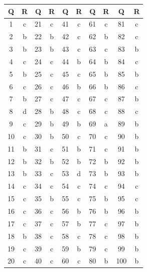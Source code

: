 \begin{center}
\begin{tabular}{|c|c||c|c||c|c||c|c||c|c|}
\hline
\textbf{Q} & \textbf{R} & \textbf{Q} & \textbf{R} & \textbf{Q} & \textbf{R} & \textbf{Q} & \textbf{R} & \textbf{Q} & \textbf{R} \\
\hline
1 & c & 21 & c & 41 & c & 61 & c & 81 & c \\
2 & b & 22 & b & 42 & c & 62 & b & 82 & c \\
3 & b & 23 & b & 43 & c & 63 & c & 83 & b \\
4 & c & 24 & c & 44 & b & 64 & b & 84 & c \\
5 & b & 25 & c & 45 & c & 65 & b & 85 & b \\
6 & c & 26 & c & 46 & b & 66 & b & 86 & c \\
7 & b & 27 & c & 47 & c & 67 & c & 87 & b \\
8 & d & 28 & b & 48 & c & 68 & c & 88 & c \\
9 & c & 29 & b & 49 & b & 69 & a & 89 & b \\
10 & c & 30 & b & 50 & c & 70 & c & 90 & b \\
11 & b & 31 & c & 51 & b & 71 & c & 91 & b \\
12 & b & 32 & b & 52 & b & 72 & b & 92 & b \\
13 & b & 33 & c & 53 & d & 73 & b & 93 & b \\
14 & c & 34 & c & 54 & c & 74 & c & 94 & c \\
15 & c & 35 & b & 55 & c & 75 & b & 95 & c \\
16 & c & 36 & c & 56 & b & 76 & b & 96 & b \\
17 & c & 37 & c & 57 & b & 77 & c & 97 & b \\
18 & b & 38 & c & 58 & c & 78 & c & 98 & b \\
19 & c & 39 & c & 59 & b & 79 & c & 99 & b \\
20 & c & 40 & c & 60 & c & 80 & b & 100 & b \\
\hline
\end{tabular}
\end{center}

